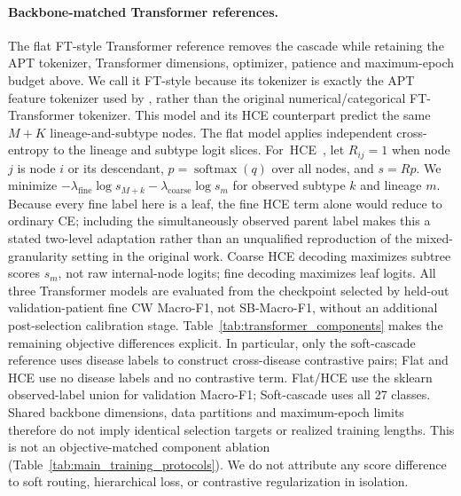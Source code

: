 \paragraph{Backbone-matched Transformer references.}
\label{sec:method:baselines}
The flat FT-style Transformer
reference \citep{gorishniy2021revisiting} removes the cascade while retaining the
APT tokenizer, Transformer dimensions, optimizer, patience and maximum-epoch
budget above. We call it FT-style because its tokenizer is exactly the APT
feature tokenizer used by \ourmethod{}, rather than the original numerical/categorical
FT-Transformer tokenizer. This model and its HCE counterpart predict the same $M+K$
lineage-and-subtype nodes. The flat model applies independent cross-entropy to the
lineage and subtype logit slices. \mbox{For HCE \citep{cultrera2026improving},} let
$R_{ij}=1$ when node $j$ is node $i$ or its descendant,
$p=\operatorname{softmax}(q)$ over all nodes, and $s=Rp$. We minimize
$-\lambda_{\mathrm{fine}}\log s_{M+k}-\lambda_{\mathrm{coarse}}\log s_m$ for
observed subtype $k$ and lineage $m$. Because every fine label here is a leaf, the
fine HCE term alone would reduce to ordinary CE; including the simultaneously
observed parent label makes this a stated two-level adaptation rather than an
unqualified reproduction of the mixed-granularity setting in the original work.
Coarse HCE decoding maximizes subtree scores $s_m$, not raw internal-node
logits; fine decoding maximizes leaf logits.
All three Transformer models are evaluated from the checkpoint selected by
held-out validation-patient fine CW Macro-F1, not SB-Macro-F1, without an additional post-selection calibration
stage. Table~\ref{tab:transformer_components} makes the remaining objective
differences explicit. In particular, only the soft-cascade reference uses disease
labels to construct cross-disease contrastive pairs; Flat and HCE use no disease
labels and no contrastive term. Flat/HCE use the sklearn observed-label union
for validation Macro-F1; Soft-cascade uses all 27 classes. Shared backbone
dimensions, data partitions and maximum-epoch limits therefore do not imply
identical selection targets or realized training lengths. This is not an
objective-matched component ablation (Table~\ref{tab:main_training_protocols}). We do not attribute any score difference to
soft routing, hierarchical loss, or contrastive regularization in isolation.


